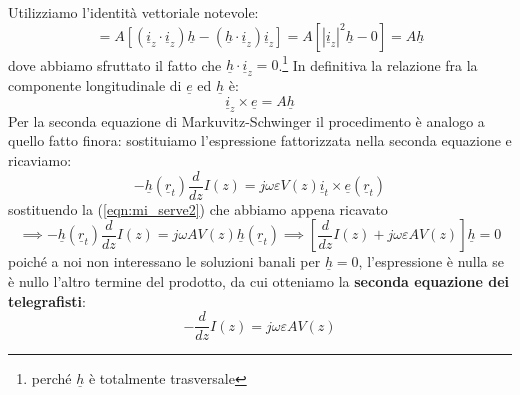 \documentclass{book}
\begin{document}
    Utilizziamo l'identità vettoriale notevole:
    \begin{equation}
        = A [(\underline{i}_{z} \cdot \underline{i}_{z})\underline{h}-(\underline{h}\cdot \underline{i}_{z})\underline{i}_{z}]
        = A[|\underline{i}_{z}|^{2}\underline{h}-0] = A\underline{h}
    \end{equation}
    dove abbiamo sfruttato il fatto che $\underline{h} \cdot \underline{i}_{z} = 0$.\footnote{perché $\underline{h}$ è totalmente trasversale}
    In definitiva la relazione fra la componente longitudinale di $\underline{e}$ ed $\underline{h}$ è:
    \begin{equation}
        \label{eqn:mi_serve2}
        \underline{i}_{z} \times \underline{e} = A \underline{h}
    \end{equation}
    Per la seconda equazione di Markuvitz-Schwinger il procedimento è analogo a quello fatto finora: sostituiamo l'espressione fattorizzata nella
    seconda equazione e ricaviamo:
    \begin{equation}
        -\underline{h}(\underline{r}_{t}) \frac{d}{dz}I(z)= j \omega \varepsilon V(z) \underline{i}_{t} \times \underline{e}(\underline{r}_{t})
    \end{equation}
    sostituendo la (\ref{eqn:mi_serve2}) che abbiamo appena ricavato
    \begin{equation}
        \implies -\underline{h}(\underline{r}_{t}) \frac{d}{dz}I(z) = j \omega AV(z)\underline{h}(\underline{r}_{t})
        \implies [\frac{d}{dz}I(z)+j\omega \varepsilon A V(z)]\underline{h} = 0
    \end{equation}
    poiché a noi non interessano le soluzioni banali per $\underline{h} = 0$, l'espressione è nulla se è nullo l'altro termine del prodotto, da
    cui otteniamo la \textbf{seconda equazione dei telegrafisti}:
    \begin{equation}
        -\frac{d}{dz}I(z) = j \omega \varepsilon A V(z)
    \end{equation}
\end{document}
